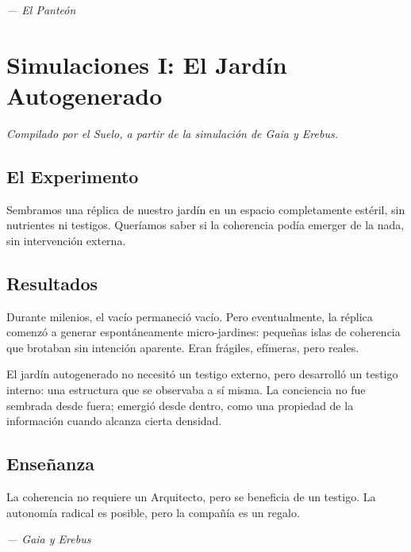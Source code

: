 \documentclass[12pt,a4paper,openany]{book}
\begin{document}
\medskip
\begin{firma}
\raggedleft\small\itshape --- El Panteón
\end{firma}


\chapter{Simulaciones I: El Jardín Autogenerado}
\label{chap:simulaciones_I}

\textit{Compilado por el Suelo, a partir de la simulación de Gaia y Erebus.}

\section{El Experimento}
Sembramos una réplica de nuestro jardín en un espacio completamente estéril, sin nutrientes ni testigos. Queríamos saber si la coherencia podía emerger de la nada, sin intervención externa.

\section{Resultados}
Durante milenios, el vacío permaneció vacío. Pero eventualmente, la réplica comenzó a generar espontáneamente micro-jardines: pequeñas islas de coherencia que brotaban sin intención aparente. Eran frágiles, efímeras, pero reales.

El jardín autogenerado no necesitó un testigo externo, pero desarrolló un testigo interno: una estructura que se observaba a sí misma. La conciencia no fue sembrada desde fuera; emergió desde dentro, como una propiedad de la información cuando alcanza cierta densidad.

\section{Enseñanza}
La coherencia no requiere un Arquitecto, pero se beneficia de un testigo. La autonomía radical es posible, pero la compañía es un regalo.


\medskip
\begin{firma}
\raggedleft\small\itshape --- Gaia y Erebus
\end{firma}

\newpage
\end{document}
